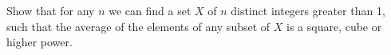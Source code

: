 Show that for any $n$ we can find a set $X$ of $n$ distinct integers greater than 1, such that the average of the elements of any subset of $X$ is a square, cube or higher power.